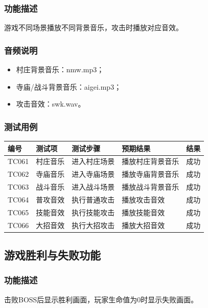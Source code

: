 \documentclass[a4paper,12pt]{article}
\begin{document}
\subsubsection{功能描述}
游戏不同场景播放不同背景音乐，攻击时播放对应音效。

\subsubsection{音频说明}
\begin{itemize}[leftmargin=2em]
    \item 村庄背景音乐：nmw.mp3；
    \item 寺庙/战斗背景音乐：aigei.mp3；
    \item 攻击音效：swk.wav。
\end{itemize}

\subsubsection{测试用例}
\begin{longtable}{p{1.2cm} p{2.8cm} p{4cm} p{3.5cm} p{1.5cm}}
\toprule
\textbf{编号} & \textbf{测试项} & \textbf{测试步骤} & \textbf{预期结果} & \textbf{结果} \\
\midrule
\endhead
TC061 & 村庄音乐 & 进入村庄场景 & 播放村庄背景音乐 & 成功 \\
TC062 & 寺庙音乐 & 进入寺庙场景 & 播放寺庙背景音乐 & 成功 \\
TC063 & 战斗音乐 & 进入战斗场景 & 播放战斗背景音乐 & 成功 \\
TC064 & 普攻音效 & 执行普通攻击 & 播放攻击音效 & 成功 \\
TC065 & 技能音效 & 执行技能攻击 & 播放技能音效 & 成功 \\
TC066 & 大招音效 & 执行大招攻击 & 播放大招音效 & 成功 \\
\bottomrule
\end{longtable}

\subsection{游戏胜利与失败功能}

\subsubsection{功能描述}
击败BOSS后显示胜利画面，玩家生命值为0时显示失败画面。
\end{document}
